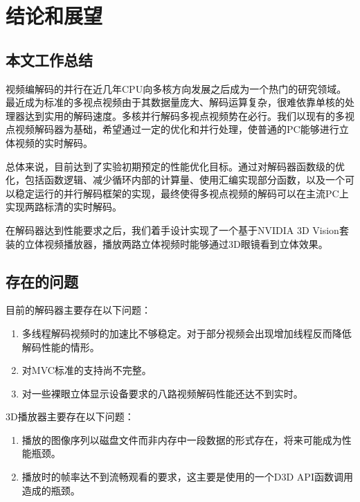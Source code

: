 

\cleardoublepage

\chapter{结论和展望}
\label{cha:conclusionandforesight}

\section{本文工作总结}
\label{sec:conclusion}
视频编解码的并行在近几年CPU向多核方向发展之后成为一个热门的研究领域。最近成为标准的多视点视频由于其数据量庞大、解码运算复杂，很难依靠单核的处理器达到实用的解码速度。多核并行解码多视点视频势在必行。我们以现有的多视点视频解码器为基础，希望通过一定的优化和并行处理，使普通的PC能够进行立体视频的实时解码。

总体来说，目前达到了实验初期预定的性能优化目标。通过对解码器函数级的优化，包括函数逻辑、减少循环内部的计算量、使用汇编实现部分函数，以及一个可以稳定运行的并行解码框架的实现，最终使得多视点视频的解码可以在主流PC上实现两路标清的实时解码。

在解码器达到性能要求之后，我们着手设计实现了一个基于NVIDIA 3D Vision套装的立体视频播放器，播放两路立体视频时能够通过3D眼镜看到立体效果。

\section{存在的问题}
\label{sec:probremained}

目前的解码器主要存在以下问题：
\begin{enumerate}
\item 多线程解码视频时的加速比不够稳定。对于部分视频会出现增加线程反而降低解码性能的情形。
\item 对MVC标准的支持尚不完整。
\item 对一些裸眼立体显示设备要求的八路视频解码性能还达不到实时。
\end{enumerate}

3D播放器主要存在以下问题：
\begin{enumerate}
\item 播放的图像序列以磁盘文件而非内存中一段数据的形式存在，将来可能成为性能瓶颈。
\item 播放时的帧率达不到流畅观看的要求，这主要是使用的一个D3D API函数调用造成的瓶颈。
\end{enumerate}


